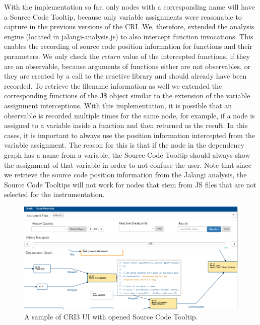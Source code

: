 With the implementation so far, only nodes with a corresponding name will have a Source Code Tooltip, because only variable assignments were reasonable to capture in the previous versions of the CRI. We, therefore, extended the analysis engine (located in jalangi-analysis.js) to also intercept function invocations. This enables the recording of source code position information for functions and their parameters. We only check the \emph{return} value of the intercepted functions, if they are an observable, because arguments of functions either are not observables, or they are created by a call to the reactive library and should already have been recorded. To retrieve the filename information as well we extended the corresponding functions of the J\$ object similar to the extension of the variable assignment interceptions. With this implementation, it is possible that an observable is recorded multiple times for the same node, for example, if a node is assigned to a variable inside a function and then returned as the result. In this cases, it is important to always use the position information intercepted from the variable assignment. The reason for this is that if the node in the dependency graph has a name from a variable, the Source Code Tooltip should always show the assignment of that variable in order to not confuse the user. Note that since we retrieve the source code position information from the Jalangi analysis, the Source Code Tooltips will not work for nodes that stem from JS files that are not selected for the instrumentation.\\

\begin{figure}[!h]
	\centering
	\includegraphics[scale=0.5,trim=0 0 0 0]{gfx/CRI-sampleView.png}
	\caption{A sample of CRI3 UI with opened Source Code Tooltip.}
	\label{fig:CRI}
\end{figure}

